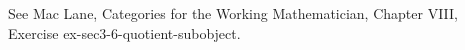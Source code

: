 See Mac Lane, Categories for the Working Mathematician, Chapter VIII, Exercise ex-sec3-6-quotient-subobject.
